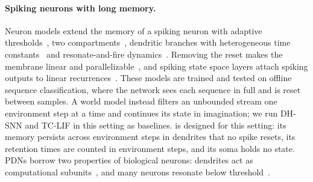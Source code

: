 \paragraph{Spiking neurons with long memory.}
Neuron models extend the memory of a spiking neuron with adaptive thresholds~\cite{bellec2018lsnn,yin2021adaptive}, two compartments~\cite{zhang2024tclif}, dendritic branches with heterogeneous time constants~\cite{zheng2024dhsnn} and resonate-and-fire dynamics~\cite{izhikevich2001resonate,higuchi2024brf,zhang2025drf}.
Removing the reset makes the membrane linear and parallelizable~\cite{fang2023psn}, and spiking state space layers attach spiking outputs to linear recurrences~\cite{shen2025spikingssm,bal2025pspikessm,fabre2025silif,stan2024learning}.
These models are trained and tested on offline sequence classification, where the network sees each sequence in full and is reset between samples.
A world model instead filters an unbounded stream one environment step at a time and continues its state in imagination; we run DH-SNN and TC-LIF in this setting as baselines.
\method is designed for this setting: its memory persists across environment steps in dendrites that no spike resets, its retention times are counted in environment steps, and its soma holds no state.
PDNs borrow two properties of biological neurons: dendrites act as computational subunits~\cite{london2005dendritic,poirazi2003pyramidal,larkum2013cellular,beniaguev2021single}, and many neurons resonate below threshold~\cite{hutcheon2000resonance}.
